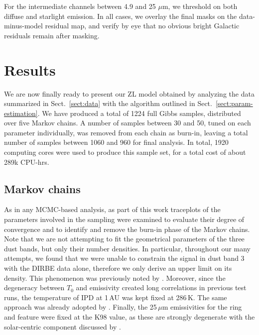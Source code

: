 \documentclass[twocolumn]{aa}
\begin{document}
For the intermediate channels between 4.9 and 25\,$\,\mu$m, we
threshold on both diffuse and starlight emission. In all cases, we
overlay the final masks on the data-minus-model residual map, and
verify by eye that no obvious bright Galactic residuals remain after
masking. 

\section{Results}\label{sect:improved-model}

We are now finally ready to present our ZL model obtained
by analyzing the data summarized in Sect.~\ref{sect:data} with the
algorithm outlined in Sect.~\ref{sect:param-estimation}. We have
produced a total of 1224 full Gibbs samples, distributed over five
Markov chains. A number of samples between 30 and 50, tuned on each parameter 
individually, was removed from each chain as burn-in, 
leaving a total number of samples between 1060 and 960 for final analysis. In total,
1920 computing cores were used to produce this sample set, for a
total cost of about 289k CPU-hrs.

\subsection{Markov chains}





As in any MCMC-based analysis, as part of this work traceplots of the 
parameters involved in the sampling were examined to evaluate their degree of convergence and to 
identify and remove the burn-in phase of the Markov chains. 
Note that we are not attempting to fit the geometrical parameters of the three dust bands, 
but only their number densities. In particular, throughout our many attempts, 
we found that we were unable to constrain the signal in dust band 3 with the DIRBE data alone, therefore 
we only derive an upper limit on its density. This phenomenon was previously noted by \citet{Spiesman}. 
Moreover, since the degeneracy between $T_0$ and emissivity created long 
correlations in previous test runs, the temperature of IPD at 1\,AU was 
kept fixed at 286\,K. The same approach was already adopted by \citet{kelsall1998}. 
Finally, the 25\,$\mu$m emissivities for the ring and feature were fixed at the K98 value, 
as these are strongly degenerate with the solar-centric component discussed by \citet{CG02_01}. 
\end{document}

